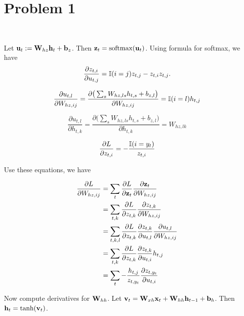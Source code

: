 \section{Problem 1}~\label{sec:prob1}

Let ${\mathbf{u}}_t:={\mathbf{W}}_{hz}{\mathbf{h}}_t+{\mathbf{b}}_z$.
Then ${\mathbf{z}}_t={\mathop{\mathrm{softmax}}}({\mathbf{u}}_t)$.
Using formula for softmax, we have
\begin{equation}
    \frac{\partial z_{t,i}}{\partial u_{t,j}} = {\mathbb{I}}(i=j)z_{t,j}-z_{t,i}z_{t,j}.
\end{equation}

\begin{equation}
    \frac{\partial u_{t,l}}{\partial W_{hz,ij}}
        = \frac{\partial \big(\sum_s W_{hz,ls}h_{t,s}+b_{z,l}\big)}{\partial W_{hz,ij}}
        = {\mathbb{I}}(i=l)h_{t,j}
\end{equation}

\begin{equation}
    \frac{\partial u_{t,l}}{\partial h_{t,k}}
        = \frac{\partial \big(\sum_s W_{hz,ls}h_{t,s}+b_{z,l}\big)}{\partial h_{t,k}}
        = W_{hz,lk}
\end{equation}

\begin{equation}
    \frac{\partial L}{\partial z_{t,i}}= -\frac{{\mathbb{I}}(i=y_t)}{z_{t,i}}
\end{equation}

Use these equations, we have

\begin{equation}
\begin{split}
    \frac{\partial L}{\partial W_{hz,ij}}
        &= \sum_t \frac{\partial L}{\partial {\mathbf{z}}_t} \frac{\partial {\mathbf{z}}_t}{\partial W_{hz,ij}} \\
        &= \sum_{t,k} \frac{\partial L}{\partial z_{t,k}} \frac{\partial z_{t,k}}{\partial W_{hz,ij}} \\
        &= \sum_{t,k,l} \frac{\partial L}{\partial z_{t,k}} \frac{\partial z_{t,k}}{\partial u_{t,l}}\frac{\partial u_{t,l}}{\partial W_{hz,ij}} \\
        &= \sum_{t,k} \frac{\partial L}{\partial z_{t,k}} \frac{\partial z_{t,k}}{\partial u_{t,i}}h_{t,j} \\
        &= \sum_{t} -\frac{h_{t,j}}{z_{t,y_t}} \frac{\partial z_{t,{y_t}}}{\partial u_{t,i}} \\
\end{split}
\end{equation}

Now compute derivatives for ${\mathbf{W}}_{hh}$.
Let ${\mathbf{v}}_t={\mathbf{W}}_{xh}{\mathbf{x}}_t+{\mathbf{W}}_{hh}{\mathbf{h}}_{t-1}+{\mathbf{b}}_h$.
Then ${\mathbf{h}}_t=\tanh({\mathbf{v}}_t)$.

